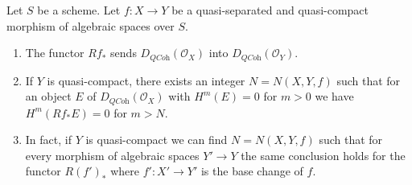 \begin{lemma}
\label{lemma-quasi-coherence-direct-image}
Let $S$ be a scheme. Let $f : X \to Y$ be a quasi-separated and quasi-compact
morphism of algebraic spaces over $S$.
\begin{enumerate}
\item The functor $Rf_*$ sends $D_{\textit{QCoh}}(\mathcal{O}_X)$
into $D_{\textit{QCoh}}(\mathcal{O}_Y)$.
\item If $Y$ is quasi-compact, there exists an integer $N = N(X, Y, f)$
such that for an object $E$ of $D_{\textit{QCoh}}(\mathcal{O}_X)$
with $H^m(E) = 0$ for $m > 0$ we have
$H^m(Rf_*E) = 0$ for $m > N$.
\item In fact, if $Y$ is quasi-compact we can find $N = N(X, Y, f)$
such that for every morphism of algebraic spaces $Y' \to Y$
the same conclusion holds for the functor $R(f')_*$
where $f' : X' \to Y'$ is the base change of $f$.
\end{enumerate}
\end{lemma}

